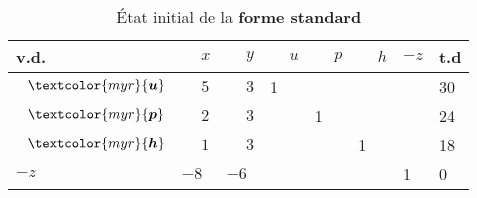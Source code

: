 \documentclass{report}
\begin{document}
\begin{multicols*}{2}
\begin{itemize}
        \begin{table}[H]
                \begin{center}
                    \renewcommand{\arraystretch}{1.5}
                    \selectfont
                    \footnotesize
                        \begin{tabular}{|l|l l l l l |l|l|}
                        \arrayrulecolor{myb}
                        \hline
                        v.d. & $\phantom{-}x$
                             & $\phantom{-}y$ & $\phantom{-}u$ & $\phantom{-}p$ & $\phantom{-}h$ & $-z$ & t.d 
                        \\
                        \hline
                        \arrayrulecolor{black}
                        $\phantom{-}\textcolor{myr}{\boldsymbol{u}}$     
                                & $\phantom{-}5$
                                & $\phantom{-}3$
                                & 1
                                & 
                                & &  &  30
                        \\
                        $\phantom{-}\textcolor{myr}{\boldsymbol{p}}$     
                               & $\phantom{-}2$
                               & $\phantom{-}3$
                               & & 1
                               & & & 24 
                        \\
                        $\phantom{-}\textcolor{myr}{\boldsymbol{h}}$     
                               & $\phantom{-}1$
                               & $\phantom{-}3$ 
                               &  & 
                               &  1
                               & & 18 
                        \\ 
                        \hline
                        $-z$ 
                                & $-8$
                                & $-6$
                                & 
                                & 
                                & 
                                & 1 & 0 
                        \\
                        \hline 



                        \end{tabular}
                \end{center}
                \caption{État initial de la \textbf{forme  standard}}
        \end{table}       
    

\end{itemize}
\end{multicols*}
\end{document}
